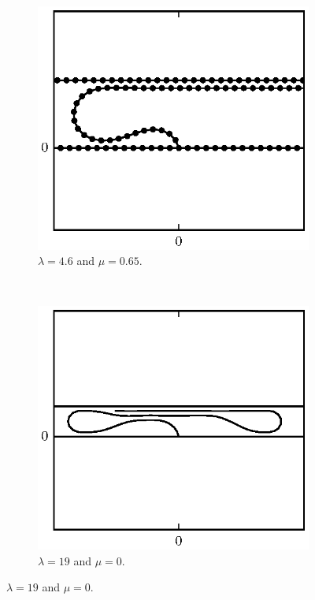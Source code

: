 	\begin{figure}
		\centering
		\begin{subfigure}{.5\textwidth}
			\centering
			\includegraphics{./fig/ch3/push/b100/l4.6_m0.65.eps}
			\caption{$\lambda=4.6$ and $\mu=0.65$.\label{subfig:short_loop}}
		\end{subfigure}%
		~
		\begin{subfigure}{.5\textwidth}
			\centering
			\includegraphics{./fig/ch3/push/b100/l19_m0.eps}
			\caption{$\lambda=19$ and $\mu=0$.\label{subfig:hairpin}}
		\end{subfigure}


\end{figure}
